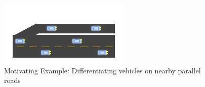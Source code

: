 \begin{figure}
\includegraphics[scale=2]{figures/frontage.pdf}
\caption{Motivating Example: Differentiating vehicles on nearby parallel roads}
\label{fig:frontage}
\end{figure}
